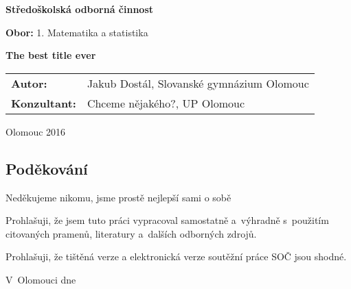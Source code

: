 \pagestyle{empty}
\begin{center}

\medskip

\vfill
{\bfseries\Large{Středoškolská odborná činnost}}

\medskip

{{\bfseries Obor: } 1. Matematika a statistika}
\vfill


\vspace{20mm}

{\LARGE\bfseries The best title ever}

\vfill

\begin{tabular}{ll}
\bfseries Autor: & Jakub Dostál, Slovanské gymnázium Olomouc\\
\noalign{\vspace{2mm}}
\bfseries Konzultant: & Chceme nějakého?, UP Olomouc\\
\end{tabular}

\vfill
Olomouc 2016
\end{center}


\newpage
\openright

\noindent
\subsection*{Poděkování}
\noindent Neděkujeme nikomu, jsme prostě nejlepší sami o sobě



\newpage

\noindent
Prohlašuji, že jsem tuto práci vypracoval samostatně a~výhradně
s~použitím citovaných pramenů, literatury a~dalších odborných zdrojů.

Prohlašuji, že tištěná verze a elektronická verze soutěžní práce SOČ jsou
shodné.

\vspace{20mm}
\noindent
V~Olomouci dne \makebox[2.5cm]{\dotfill}
\hspace*{\fill}
\makebox[3cm]{\dotfill}
\hspace*{\fill}

